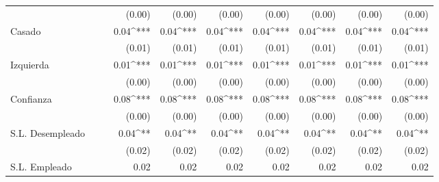 \documentclass[12pt,letterpaper]{article}
\begin{document}
\begin{landscape}
\begin{table}
\begin{center}
\begin{tabular}{l D{.}{.}{5} D{.}{.}{5} D{.}{.}{5} D{.}{.}{5} D{.}{.}{5} D{.}{.}{5} D{.}{.}{5} D{.}{.}{5} D{.}{.}{5} }
				&                        &                        & (0.00)                 & (0.00)                 & (0.00)                 & (0.00)                 & (0.00)                 & (0.00)                 & (0.00)                 \\
				Casado                     &                        &                        & 0.04^{***}             & 0.04^{***}             & 0.04^{***}             & 0.04^{***}             & 0.04^{***}             & 0.04^{***}             & 0.04^{***}             \\
				&                        &                        & (0.01)                 & (0.01)                 & (0.01)                 & (0.01)                 & (0.01)                 & (0.01)                 & (0.01)                 \\
				Izquierda                  &                        &                        & 0.01^{***}             & 0.01^{***}             & 0.01^{***}             & 0.01^{***}             & 0.01^{***}             & 0.01^{***}             & 0.01^{***}             \\
				&                        &                        & (0.00)                 & (0.00)                 & (0.00)                 & (0.00)                 & (0.00)                 & (0.00)                 & (0.00)                 \\
				Confianza                  &                        &                        & 0.08^{***}             & 0.08^{***}             & 0.08^{***}             & 0.08^{***}             & 0.08^{***}             & 0.08^{***}             & 0.08^{***}             \\
				&                        &                        & (0.00)                 & (0.00)                 & (0.00)                 & (0.00)                 & (0.00)                 & (0.00)                 & (0.00)                 \\
				S.L. Desempleado           &                        &                        & 0.04^{**}              & 0.04^{**}              & 0.04^{**}              & 0.04^{**}              & 0.04^{**}              & 0.04^{**}              & 0.04^{**}              \\
				&                        &                        & (0.02)                 & (0.02)                 & (0.02)                 & (0.02)                 & (0.02)                 & (0.02)                 & (0.02)                 \\
				S.L. Empleado              &                        &                        & 0.02                   & 0.02                   & 0.02                   & 0.02                   & 0.02                   & 0.02                   & 0.02                   \\

\end{tabular}
\end{center}
\end{table}
\end{landscape}
\end{document}
